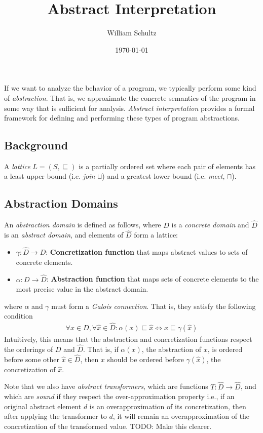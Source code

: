 \documentclass[10pt]{article}
\begin{document}
\title{Abstract Interpretation}
\author{William Schultz}
\date{\today}

\maketitle


If we want to analyze the behavior of a program, we typically perform some kind of \textit{abstraction}. That is, we approximate the concrete semantics of the program in some way that is sufficient for analysis. \textit{Abstract interpretation} provides a formal framework for defining and performing these types of program abstractions.

\subsection*{Background}

A \textit{lattice} $L=(S,\sqsubseteq)$ is a partially ordered set where each pair of elements has a least upper bound (i.e. \textit{join} $\sqcup$) and a greatest lower bound (i.e. \textit{meet}, $\sqcap$).

\subsection*{Abstraction Domains}

An \textit{abstraction domain} is defined as follows, where $D$ is a \textit{concrete domain} and $\hat{D}$ is an \textit{abstract domain}, and elements of $\hat{D}$ form a lattice:
\begin{itemize}
    \item $\gamma : \hat{D} \rightarrow D$: \textbf{Concretization function} that maps abstract values to sets of concrete elements.
    \item $\alpha : D \rightarrow \hat{D}$: \textbf{Abstraction function} that maps sets of concrete elements to the most precise value in the abstract domain. 
\end{itemize}
where $\alpha$ and $\gamma$ must form a \textit{Galois connection}. That is, they satisfy the following condition
\begin{align*}
    \forall x \in D, \forall \hat{x} \in \hat{D} : \alpha(x) \sqsubseteq \hat{x} \Leftrightarrow x \sqsubseteq \gamma(\hat{x}) 
\end{align*} 
Intuitively, this means that the abstraction and concretization functions respect the orderings of $D$ and $\hat{D}$. That is, if $\alpha(x)$, the abstraction of $x$, is ordered before some other $\hat{x} \in \hat{D}$, then $x$ should be ordered before $\gamma(\hat{x})$, the concretization of $\hat{x}$.

Note that we also have \textit{abstract transformers}, which are functions $T: \hat{D} \rightarrow \hat{D}$, and which are \textit{sound} if they respect the over-approximation property i.e., if an original abstract element $d$ is an overapproximation of its concretization, then after applying the transformer to $d$, it will remain an overapproximation of the concretization of the transformed value. TODO: Make this clearer. 
\end{document}
